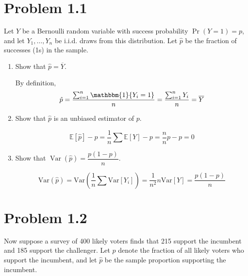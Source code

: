 \documentclass[11pt]{article}
\newcommand{\Var}{\text{Var}}
\newcommand{\bbE}{\mathbb{E}}
\begin{document}
	
	
	\psetheader

\section*{Problem 1.1}
Let \( Y \) be a Bernoulli random variable with success probability \( \Pr(Y = 1) = p \), and let \( Y_1, \dots, Y_n \) be i.i.d. draws from this distribution. Let \( \hat{p} \) be the fraction of successes (1s) in the sample.

\begin{enumerate}[label=(\alph*)]
    \item Show that \( \hat{p} = \overline{Y} \).
\begin{solution}
    By definition, 
    \[\hat{p} = \frac{\sum_{i=1}^n \mathbbm{1}\{Y_i = 1\}}{n} = \frac{\sum_{i=1}^n Y_i}{n} = \overline{Y}\]
\end{solution}
    \item Show that \( \hat{p} \) is an unbiased estimator of \( p \).
    \begin{solution}
        \[\bbE[\hat{p}] - p = \frac{1}{n}\sum\bbE[Y] - p = \frac{n}{n} p - p = 0\]
    \end{solution}
    \item Show that \( \operatorname{Var}(\hat{p}) = \dfrac{p(1 - p)}{n} \).
    \begin{solution}
        \[\Var(\hat{p}) = \Var(\frac{1}{n}\sum \Var[Y_i]) = \frac{1}{n^2}n\Var[Y] = \frac{p(1-p)}{n}\]
    \end{solution}
\end{enumerate}

\section*{Problem 1.2}

Now suppose a survey of 400 likely voters finds that 215 support the incumbent and 185 support the challenger. Let \( p \) denote the fraction of all likely voters who support the incumbent, and let \( \hat{p} \) be the sample proportion supporting the incumbent.
\end{document}
